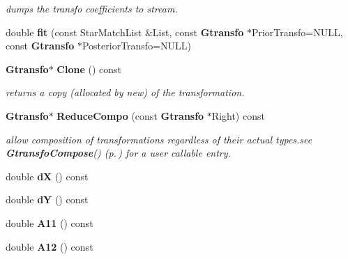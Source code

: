 \begin{CompactItemize}
\begin{CompactList}\small\item\em dumps the transfo coefficients to stream.\item\end{CompactList}\item 
double {\bf fit} (const Star\-Match\-List \&List, const {\bf Gtransfo} $\ast$Prior\-Transfo=NULL, const {\bf Gtransfo} $\ast$Posterior\-Transfo=NULL)
\item 
{}
{\bf Gtransfo}$\ast$ {\bf Clone} () const\label{class_gtransfocub_a7}

\begin{CompactList}\small\item\em returns a copy (allocated by new) of the transformation.\item\end{CompactList}\item 
{}
{\bf Gtransfo}$\ast$ {\bf Reduce\-Compo} (const {\bf Gtransfo} $\ast$Right) const\label{class_gtransfocub_a8}

\begin{CompactList}\small\item\em allow composition of transformations regardless of their actual types.see {\bf Gtransfo\-Compose}() {\rm (p.\,\pageref{gtransfo_h_a1})} for a user callable entry.\item\end{CompactList}\item 
{}
double {\bf d\-X} () const\label{class_gtransfocub_a9}

\item 
{}
double {\bf d\-Y} () const\label{class_gtransfocub_a10}

\item 
{}
double {\bf A11} () const\label{class_gtransfocub_a11}

\item 
{}
double {\bf A12} () const\label{class_gtransfocub_a12}


\end{CompactItemize}
